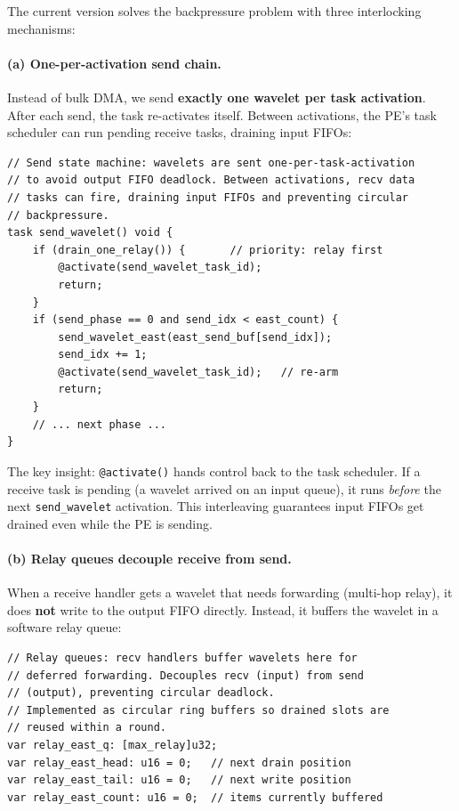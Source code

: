 \documentclass[11pt,letterpaper]{article}
\begin{document}
The current version solves the backpressure problem with three interlocking mechanisms:

\paragraph{(a) One-per-activation send chain.}
Instead of bulk DMA, we send \textbf{exactly one wavelet per task activation}. After each send, the task re-activates itself. Between activations, the PE's task scheduler can run pending receive tasks, draining input FIFOs:

\begin{lstlisting}[language=CSL, caption={Current approach: one wavelet per activation}, label=lst:onesend]
// Send state machine: wavelets are sent one-per-task-activation
// to avoid output FIFO deadlock. Between activations, recv data
// tasks can fire, draining input FIFOs and preventing circular
// backpressure.
task send_wavelet() void {
    if (drain_one_relay()) {       // priority: relay first
        @activate(send_wavelet_task_id);
        return;
    }
    if (send_phase == 0 and send_idx < east_count) {
        send_wavelet_east(east_send_buf[send_idx]);
        send_idx += 1;
        @activate(send_wavelet_task_id);   // re-arm
        return;
    }
    // ... next phase ...
}
\end{lstlisting}

The key insight: \texttt{@activate()} hands control back to the task scheduler. If a receive task is pending (a wavelet arrived on an input queue), it runs \emph{before} the next \texttt{send\_wavelet} activation. This interleaving guarantees input FIFOs get drained even while the PE is sending.

\paragraph{(b) Relay queues decouple receive from send.}
When a receive handler gets a wavelet that needs forwarding (multi-hop relay), it does \textbf{not} write to the output FIFO directly. Instead, it buffers the wavelet in a software relay queue:

\begin{lstlisting}[language=CSL, numbers=none]
// Relay queues: recv handlers buffer wavelets here for
// deferred forwarding. Decouples recv (input) from send
// (output), preventing circular deadlock.
// Implemented as circular ring buffers so drained slots are
// reused within a round.
var relay_east_q: [max_relay]u32;
var relay_east_head: u16 = 0;   // next drain position
var relay_east_tail: u16 = 0;   // next write position
var relay_east_count: u16 = 0;  // items currently buffered
\end{lstlisting}
\end{document}
